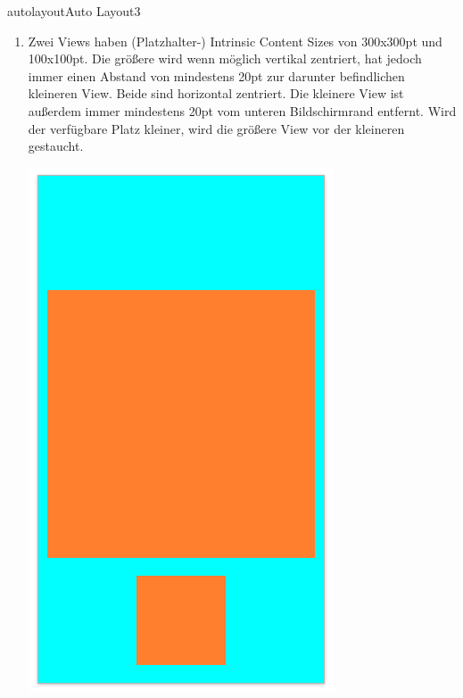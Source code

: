 \documentclass[parskip=half, final]{scrreprt}
\begin{document}
\begin{lecture}
\begin{exc}
\begin{excitem}{autolayout}{Auto Layout}{3}
\begin{enumerate}
\begin{minipage}{.5\linewidth}
\end{minipage}

\item Zwei Views haben (Platzhalter-) Intrinsic Content Sizes von 300x300pt und 100x100pt. Die größere wird wenn möglich vertikal zentriert, hat jedoch immer einen Abstand von mindestens 20pt zur darunter befindlichen kleineren View. Beide sind horizontal zentriert. Die kleinere View ist außerdem immer mindestens 20pt vom unteren Bildschirmrand entfernt. Wird der verfügbare Platz kleiner, wird die größere View vor der kleineren gestaucht.

\begin{minipage}{.5\linewidth}
  \centering
  \includegraphics[width=\linewidth, height=\linewidth, keepaspectratio]{img/al_11.png}
\end{minipage}
\begin{minipage}{.5\linewidth}
  \centering

\end{minipage}
\end{enumerate}
\end{excitem}
\end{exc}
\end{lecture}
\end{document}
